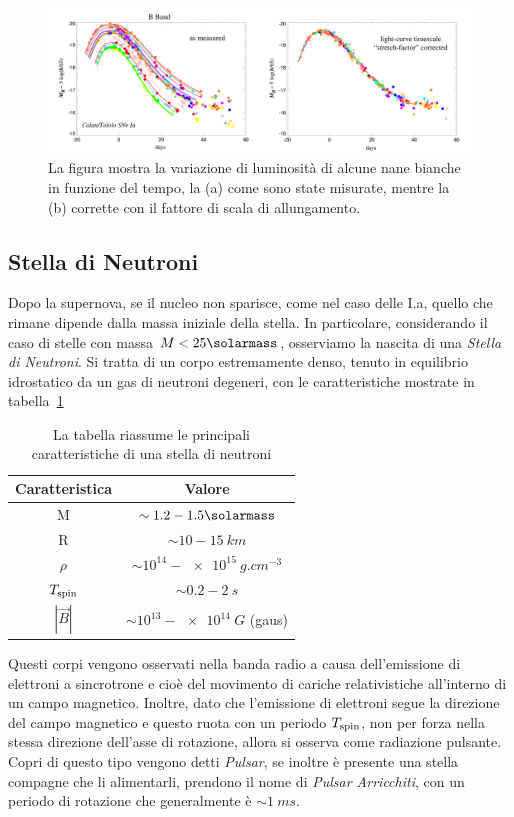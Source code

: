 \begin{figure}
    \centering
    \includegraphics[width = \textwidth]{immagini/stretch_hammuy.png}
    \caption{La figura mostra la variazione di luminosità di alcune nane bianche in funzione del tempo, la (a) come sono state misurate, mentre la (b) corrette con il fattore di scala di allungamento.}\label{fig:std-candle}
\end{figure}

\subsection{Stella di Neutroni}\label{sec:stella-neutroni}
Dopo la supernova, se il nucleo non sparisce, come nel caso delle I.a, quello che rimane dipende dalla massa iniziale della stella. In particolare, considerando il caso di stelle con massa $M < 25\si{\solarmass}$, osserviamo la nascita di una \textit{Stella di Neutroni}. Si tratta di un corpo estremamente denso, tenuto in equilibrio idrostatico da un gas di neutroni degeneri, con le caratteristiche mostrate in tabella~\ref{tab:neutron-star}
\begin{table}
    \centering
    \caption{La tabella riassume le principali caratteristiche di una stella di neutroni}\label{tab:neutron-star}
    \begin{tabular}{c|c}
        \toprule
        Caratteristica & Valore\\
        \midrule
        M&$\sim 1.2 - 1.5 \si{\solarmass}$ \\
        R&$\sim 10 - \SI{15}{km}$ \\
        $\rho$&$\sim 10^{14} - \SI{e15}{g.cm^{-3}}$ \\
        $T_{\mbox{\scriptsize{spin}}}$& $\sim 0.2 - \SI{2}{s}$ \\
        $|\vec{B}|$& $\sim 10^{13} - \SI{e14}{G}$ (gaus)\\
        \bottomrule
    \end{tabular}
\end{table}

Questi corpi vengono osservati nella banda radio a causa dell'emissione di elettroni a sincrotrone e cioè del movimento di cariche relativistiche all'interno di un campo magnetico. Inoltre, dato che l'emissione di elettroni segue la direzione del campo magnetico e questo ruota con un periodo $T_{\mbox{\scriptsize{spin}}}$, non per forza nella stessa direzione dell'asse di rotazione, allora si osserva come radiazione pulsante. Copri di questo tipo vengono detti \textit{Pulsar}, se inoltre è presente una stella compagne che li alimentarli, prendono il nome di \textit{Pulsar Arricchiti}, con un periodo di rotazione che generalmente è $\sim \SI{1}{ms}$.

